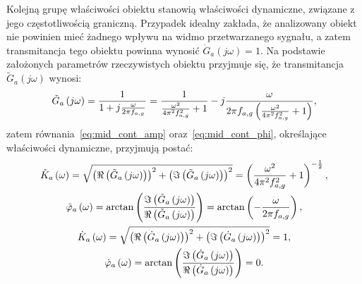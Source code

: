 Kolejną grupę właściwości obiektu stanowią właściwości dynamiczne, związane z jego częstotliwością graniczną. Przypadek idealny zakłada, że analizowany obiekt nie powinien mieć żadnego wpływu na widmo przetwarzanego sygnału, a zatem transmitancja tego obiektu powinna wynosić $\dot{G}_{a}(j\omega) = 1$. Na podstawie założonych parametrów rzeczywistych obiektu przyjmuje się, że transmitancja $\tilde{G}_{a}(j\omega)$ wynosi:
\begin{equation}
\tilde{G}_{a} \left(j\omega\right) = \frac{1}{1 + j \frac{\omega}{2 \pi f_{a,g}}} = \frac{1}{\frac{\omega^{2}}{4 \pi^{2} f_{a,g}^{2}} + 1} - j \frac{\omega}{2 \pi f_{a,g} \left( \frac{\omega^{2}}{4 \pi^{2} f_{a,g}^{2}} + 1 \right) } \label{eq:sym_parta_trans},
\end{equation}
zatem równania~\eqref{eq:mid_cont_amp} oraz~\eqref{eq:mid_cont_phi}, określające właściwości dynamiczne, przyjmują postać:
\begin{gather}
\tilde{K}_{a} \left(\omega\right) = \sqrt{\left( \Re \left( \tilde{G}_{a} \left(j\omega\right) \right) \right)^{2} + \left( \Im \left( \tilde{G}_{a} \left(j\omega\right) \right) \right)^{2}} = \left( \frac{\omega^{2}}{4 \pi^{2} f_{a,g}^{2}} + 1 \right)^{-\frac{1}{2}} \label{eq:sym_parta_amp_real}, \\
\tilde{\varphi}_{a} \left(\omega\right) = \arctan \left( \frac{\Im \left( \tilde{G}_{a} \left(j\omega\right) \right)}{\Re \left( \tilde{G}_{a} \left(j\omega\right) \right)} \right) = \arctan \left( -\frac{\omega}{2 \pi f_{a,g}} \right) \label{eq:sym_parta_phi_real}, \\
\dot{K}_{a} \left(\omega\right) = \sqrt{\left( \Re \left( \dot{G}_{a} \left(j\omega\right) \right) \right)^{2} + \left( \Im \left( \dot{G}_{a} \left(j\omega\right) \right) \right)^{2}} = 1 \label{eq:sym_parta_amp_ideal}, \\
\dot{\varphi}_{a} \left(\omega\right) = \arctan \left( \frac{\Im \left( \dot{G}_{a} \left(j\omega\right) \right)}{\Re \left( \dot{G}_{a} \left(j\omega\right) \right)} \right) = 0 \label{eq:sym_parta_phi_ideal}.
\end{gather}

